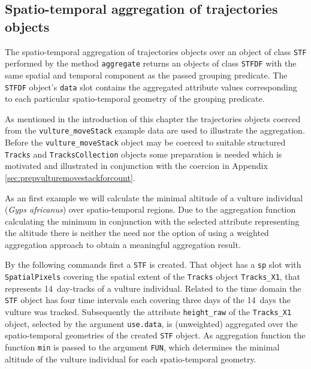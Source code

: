 \documentclass[12pt, oneside, a4paper]{scrbook}
\newcommand{\pkg}[1]{{\normalfont\fontseries{b}\selectfont #1}}
\let\code=\texttt
\begin{document}
\subsection{Spatio-temporal aggregation of \pkg{trajectories} objects}
\label{subsec:aggoverstf}

The spatio-temporal aggregation of \pkg{trajectories} objects over an object of class \code{STF} performed by the method \code{aggregate} returns an objects of class \code{STFDF} with the same spatial and temporal component as the passed grouping predicate.
The \code{STFDF} object's \code{data} slot contains the aggregated attribute values corresponding to each particular spatio-temporal geometry of the grouping predicate.
\par\medskip

As mentioned in the introduction of this chapter the \pkg{trajectories} objects coerced from the \code{vulture\_moveStack} example data are used to illustrate the aggregation.
Before the \code{vulture\_moveStack} object may be coerced to suitable structured \code{Tracks} and \code{TracksCollection} objects some preparation is needed which is motivated and illustrated in conjunction with the coercion in Appendix \ref{sec:prepvulturemovestackforcount}.
\par\medskip

As an first example we will calculate the minimal altitude of a vulture individual (\textit{Gyps africanus}) over spatio-temporal regions. Due to the aggregation function calculating the minimum in conjunction with the selected attribute representing the altitude there is neither the need nor the option of using a weighted aggregation approach to obtain a meaningful aggregation result.
\par\medskip

By the following commands first a \code{STF} is created. That object has a \code{sp} slot with \code{SpatialPixels} covering the spatial extent of the \code{Tracks} object \code{Tracks\_X1}, that represents 14~day-tracks of a vulture individual. 
Related to the time domain the \code{STF} object has four time intervals each covering three days of the 14~days the vulture was tracked. 
Subsequently the attribute \code{height\_raw} of the \code{Tracks\_X1} object, selected by the argument \code{use.data}, is (unweighted) aggregated over the spatio-temporal geometries of the created \code{STF} object.
As aggregation function the function \code{min} is passed to the argument \code{FUN}, which determines the  minimal altitude of the vulture individual for each spatio-temporal geometry. 
\par\medskip
\end{document}
